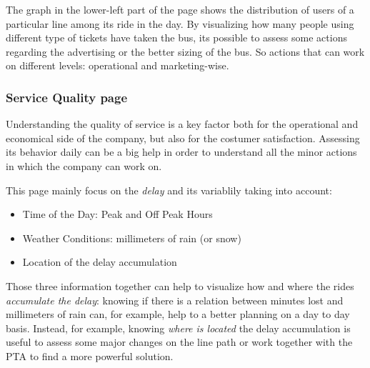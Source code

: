 The graph in the lower-left part of the page shows the distribution of users of a particular line among its ride in the day. By visualizing how many people using different type of tickets have taken the bus, its possible to assess some actions regarding the advertising or the better sizing of the bus. So actions that can work on different levels: operational and marketing-wise.

\newpage
\begin{landscape}
\thispagestyle{empty}

\end{landscape}

\subsubsection{Service Quality page}
Understanding the quality of service is a key factor both for the operational and economical side of the company, but also for the costumer satisfaction. Assessing its behavior daily can be a big help in order to understand all the minor actions in which the company can work on.

This page mainly focus on the \emph{delay} and its variablily taking into account:
\begin{itemize}
    \item Time of the Day: Peak and Off Peak Hours
    \item Weather Conditions: millimeters of rain (or snow)
    \item Location of the delay accumulation
\end{itemize}

Those three information together can help to visualize how and where the rides \emph{accumulate the delay}: knowing if there is a relation between minutes lost and millimeters of rain can, for example, help to a better planning on a day to day basis. Instead, for example, knowing \emph{where is located} the delay accumulation is useful to assess some major changes on the line path or work together with the PTA to find a more powerful solution.

\newpage
\begin{landscape}
\thispagestyle{empty}

\end{landscape}

